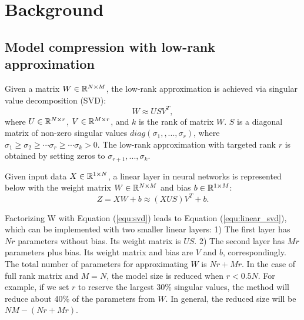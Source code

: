 \documentclass{article} %
\begin{document}

\section{Background}

\subsection{Model compression with low-rank approximation}

Given a matrix $W \in \mathbb{R}^{N \times M}$, the low-rank approximation is achieved via singular value decomposition (SVD):
\begin{equation}
    W \approx US{V^T},
\label{equ:svd}
\end{equation}
where $U \in \mathbb{R}^{N \times r}$, $V \in \mathbb{R}^{M \times r}$, and $k$ is the rank of matrix $W$. $S$ is a diagonal matrix of non-zero singular values $diag(\sigma_1, ,...,\sigma_r)$, where ${\sigma _1} \ge {\sigma _2} \ge  \cdots {\sigma _r} \ge  \cdots {\sigma _k} > 0$. The low-rank approximation with targeted rank $r$ is obtained by setting zeros to  $\sigma_{r+1},...,\sigma_k$.

Given input data $X \in \mathbb{R}^{1 \times N}$, a linear layer in neural networks is represented below with the weight matrix $W \in \mathbb{R}^{N \times M}$ and bias $b \in \mathbb{R}^{1 \times M}$:
\begin{equation}
Z = XW + b  \approx (XUS){V^T} + b.
\label{equ:linear_svd}
\end{equation}

Factorizing W with Equation (\ref{equ:svd}) leads to Equation (\ref{equ:linear_svd}), which can be implemented with two smaller linear layers: 1) The first layer has $Nr$ parameters without bias. Its weight matrix is $US$. 2) The second layer has $Mr$ parameters plus bias. Its weight matrix and bias are $V$ and $b$, correspondingly. 
The total number of parameters for approximating $W$ is $Nr+Mr$. In the case of full rank matrix and $M=N$, the model size is reduced when $r<0.5N$. For example, if we set $r$ to reserve the largest 30\% singular values, the method will reduce about 40\% of the parameters from $W$. In general, the reduced size will be $NM-(Nr+Mr)$.
\end{document}
